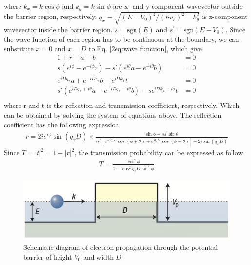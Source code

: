     where $k_x = k \cos{\phi}$ and $k_y = k \sin{\phi}$ are x- and y-component wavevector outside the barrier region, respectively.
    $q_x = \sqrt{(E-V_0)^2/(\hbar v_F)^2-k_y^2}$ is x-component wavevector inside the barrier region. 
    $s = \mathrm{sgn}(E)$ and $s^{\prime} = \mathrm{sgn}(E-V_0)$. 
    Since the wave function of each region has to be continuous at the boundary, we can substitute $x = 0$ and $x = D$ to Eq. \ref{2eq:wave function}, which give
    \begin{equation} \label{2eq:boundary condition}
        \begin{aligned}
            1+r-a-b&=0\\
            s(e^{i\phi}-e^{-i\phi}r)-s\prime (e^{i\theta}a-e^{-i\theta}b)&=0\\
            e^{iDq_x}a+e^{-iDq_x}b-e^{iDk_x}t&=0\\
            s \prime (e^{iDq_x+i\theta}a-e^{-iDq_x-i\theta} b)-se^{iDk_x+i\phi}t&=0\\
        \end{aligned}
    \end{equation}
    where r and t is the reflection and transmission coefficient, respectively. Which can be obtained by solving the system of equations above.
    The reflection coefficient has the following expression
    \begin{align} \label{2eq:reflection coefficient}
        r=2ie^{i\phi}\sin{(q_xD)}\times\frac{\sin{\phi}-ss^{\prime}\sin{\theta}}{ss^{\prime}[e^{-iq_xD}\cos{(\phi+\theta)}+e^{iq_xD}\cos{(\phi-\theta)}]-2i\sin{(q_xD)}}
    \end{align}
    Since $T = |t|^2 = 1-|r|^2$, the transmission probability can be expressed as follow
    \begin{align} \label{2eq:transmission probability}
        T = \frac{\cos^2{\phi}}{1-\cos^2{q_x D}\sin^2{\phi}}
    \end{align}
    \begin{figure}[H]
        \centering
        \includegraphics[width=0.7\linewidth]{fig/Chap 2/electron propagation.png}
        \caption{Schematic diagram of electron propagation through the potential barrier of height $V_0$ and width $D$}
        \label{2fig:electron propagation}
    \end{figure}